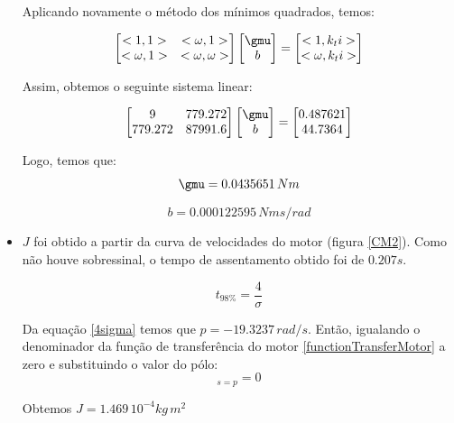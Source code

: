\documentclass[]{politex}
\begin{document}
\begin{itemize}
Aplicando novamente o método dos mínimos quadrados, temos:

\begin{equation}
\begin{bmatrix}
<1, 1> & <\omega, 1>\\
<\omega, 1> & <\omega, \omega>
\end{bmatrix}
\begin{bmatrix}
\gmu\\
b
\end{bmatrix}= 
\begin{bmatrix}
<1, k_{t} i >\\
<\omega, k_{t} i >
\end{bmatrix}
\end{equation}

Assim, obtemos o seguinte sistema linear:

\begin{equation}
\begin{bmatrix}
9 & 779.272\\
779.272 & 87991.6
\end{bmatrix}
\begin{bmatrix}
\gmu\\
b
\end{bmatrix}= 
\begin{bmatrix}
0.487621\\
44.7364
\end{bmatrix}
\end{equation}

Logo, temos que: 
\begin{equation}
\gmu = 0.0435651 \, Nm
\end{equation}

\begin{equation}
b = 0.000122595 \, Nm s/rad
\end{equation}

\item $J$ foi obtido a partir da curva de velocidades do motor (figura \ref{CM2}). Como não houve sobressinal, o tempo de assentamento obtido foi de $0.207 s$.

\begin{equation}
\label{4sigma}
 t_{98\%} =\frac{4}{\sigma}
\end{equation}

Da equação \eqref{4sigma} temos que $p= -19.3237  \, rad/s$.
Então, igualando o denominador da função de transferência do motor \eqref{functionTransferMotor}  a zero e substituindo o valor do pólo:
\begin{equation}
[(L s + R) (J s + b) + k_t k_e]_{s = p} = 0
\end{equation}

Obtemos $J = 1.469 \, 10^{-4} kg \, m^2 $

\end{itemize}
\end{document}
